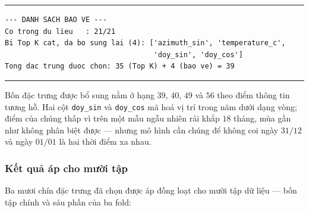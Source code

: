 \begingroup
\par\vspace{6pt}\hrule\vspace{4pt}
\footnotesize\renewcommand{\baselinestretch}{1.0}\selectfont
\begin{verbatim}
--- DANH SACH BAO VE ---
Co trong du lieu   : 21/21
Bi Top K cat, da bo sung lai (4): ['azimuth_sin', 'temperature_c',
                                   'doy_sin', 'doy_cos']
Tong dac trung duoc chon: 35 (Top K) + 4 (bao ve) = 39
\end{verbatim}
\vspace{2pt}\hrule\par\vspace{6pt}
\endgroup

Bốn đặc trưng được bổ sung nằm ở hạng $39$, $40$, $49$ và $56$ theo điểm thông tin tương
hỗ. Hai cột \texttt{doy\_sin} và \texttt{doy\_cos} mã hoá vị trí trong năm dưới dạng vòng; điểm của
chúng thấp vì trên một mẫu ngẫu nhiên rải khắp $18$ tháng, mùa gần như không phân biệt được ---
nhưng mô hình cần chúng để không coi ngày $31/12$ và ngày $01/01$ là hai thời điểm xa nhau.

\subsubsection{Kết quả áp cho mười tập}

Ba mươi chín đặc trưng đã chọn được áp đồng loạt cho mười tập dữ liệu --- bốn tập chính và sáu phần
của ba fold:


